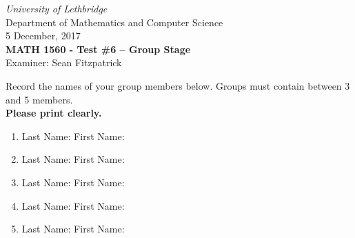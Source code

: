 \documentclass[12pt]{article}
\newcommand{\skipline}{\vspace{12pt}}
\begin{document}
\author{Instructor: Sean Fitzpatrick}
\thispagestyle{plain}
\begin{center}
\emph{University of Lethbridge}\\
Department of Mathematics and Computer Science\\
5 December, 2017\\
{\bf MATH 1560 - Test \#6 -- Group Stage}\\
Examiner: Sean Fitzpatrick
\end{center}

\skipline \skipline \skipline \noindent \skipline

Record the names of your group members below. Groups must contain between 3 and 5 members. \\

\textbf{Please print clearly.}

\skipline

\begin{enumerate}
\item Last Name:\underline{\hspace{200pt}} \quad First Name:\underline{\hspace{140pt}}

\skipline\skipline

\item Last Name:\underline{\hspace{200pt}} \quad First Name:\underline{\hspace{140pt}}

\skipline\skipline

\item Last Name:\underline{\hspace{200pt}} \quad First Name:\underline{\hspace{140pt}}

\skipline\skipline

\item Last Name:\underline{\hspace{200pt}} \quad First Name:\underline{\hspace{140pt}}

\skipline\skipline

\item Last Name:\underline{\hspace{200pt}} \quad First Name:\underline{\hspace{140pt}}

\end{enumerate}
%
\end{document}
